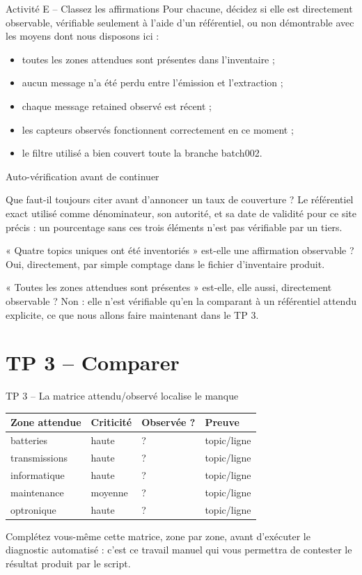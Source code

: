 \documentclass[aspectratio=169]{beamer}
\begin{document}
\begin{frame}{Activité E -- Classez les affirmations}
Pour chacune, décidez si elle est directement observable, vérifiable seulement à l'aide d'un référentiel, ou non démontrable avec les moyens dont nous disposons ici :
\begin{itemize}
\item toutes les zones attendues sont présentes dans l'inventaire ;
\item aucun message n'a été perdu entre l'émission et l'extraction ;
\item chaque message retained observé est récent ;
\item les capteurs observés fonctionnent correctement en ce moment ;
\item le filtre utilisé a bien couvert toute la branche batch002.
\end{itemize}
\end{frame}

\begin{frame}{Auto-vérification avant de continuer}
\small
\begin{block}{Que faut-il toujours citer avant d'annoncer un taux de couverture ?}
Le référentiel exact utilisé comme dénominateur, son autorité, et sa date de validité pour ce site précis : un pourcentage sans ces trois éléments n'est pas vérifiable par un tiers.
\end{block}
\begin{block}{« Quatre topics uniques ont été inventoriés » est-elle une affirmation observable ?}
Oui, directement, par simple comptage dans le fichier d'inventaire produit.
\end{block}
\begin{block}{« Toutes les zones attendues sont présentes » est-elle, elle aussi, directement observable ?}
Non : elle n'est vérifiable qu'en la comparant à un référentiel attendu explicite, ce que nous allons faire maintenant dans le TP 3.
\end{block}
\end{frame}

\section{TP 3 -- Comparer}
\begin{frame}{TP 3 -- La matrice attendu/observé localise le manque}
\small
\begin{tabular}{llll}
\toprule
Zone attendue & Criticité & Observée ? & Preuve \\
\midrule
batteries & haute & ? & topic/ligne \\
transmissions & haute & ? & topic/ligne \\
informatique & haute & ? & topic/ligne \\
maintenance & moyenne & ? & topic/ligne \\
optronique & haute & ? & topic/ligne \\
\bottomrule
\end{tabular}
\vfill
\normalsize Complétez vous-même cette matrice, zone par zone, avant d'exécuter le diagnostic automatisé : c'est ce travail manuel qui vous permettra de contester le résultat produit par le script.
\end{frame}
\end{document}
